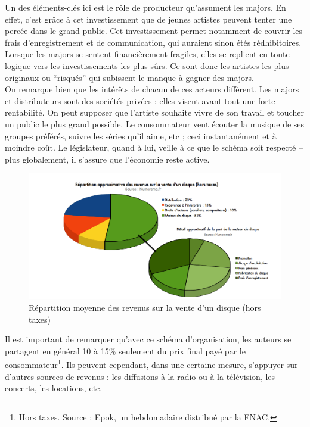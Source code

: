 \documentclass[a4paper]{report}
\begin{document}
	Un des éléments-clés ici est le rôle de producteur qu'assument les majors. En effet, c'est grâce à cet investissement que de jeunes artistes peuvent tenter une percée dans le grand public. Cet investissement permet notamment de couvrir les frais d'enregistrement et de communication, qui auraient sinon étés rédhibitoires. Lorsque les majors se sentent financièrement fragiles, elles se replient en toute logique vers les investissements les plus sûrs. Ce sont donc les artistes les plus originaux ou ``risqués'' qui subissent le manque à gagner des majors.\\

	On remarque bien que les intérêts de chacun de ces acteurs diffèrent. Les majors et distributeurs sont des sociétés privées : elles visent avant tout une forte rentabilité. On peut supposer que l'artiste souhaite vivre de son travail et toucher un public le plus grand possible. Le consommateur veut écouter la musique de ses groupes préférés, suivre les séries qu'il aime, etc ; ceci instantanément et à moindre coût. Le législateur, quand à lui, veille à ce que le schéma soit respecté – plus globalement, il s'assure que l'économie reste active.

	\begin{figure}[ht]
		\includegraphics[width=13cm]{images/repartition-des-revenus.png}
		\caption{Répartition moyenne des revenus sur la vente d'un disque (hors taxes)}
	\end{figure}

	Il est important de remarquer qu'avec ce schéma d'organisation, les auteurs se partagent en général 10 à 15\% seulement du prix final payé par le consommateur\footnote{Hors taxes. Source : Epok, un hebdomadaire distribué par la FNAC.}. Ils peuvent cependant, dans une certaine mesure, s'appuyer sur d'autres sources de revenus : les diffusions à la radio ou à la télévision, les concerts, les locations, etc.
\end{document}

